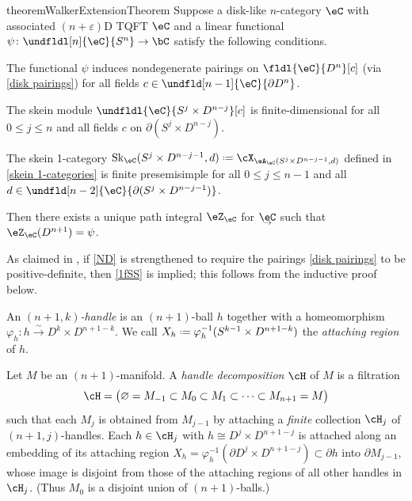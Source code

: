 \documentclass[12pt,reqno]{amsart}
\newcommand{\Sk}{\mathrm{Sk}}
\newcommand{\A}{\eA}
\newcommand{\C}{\eC}
\newcommand{\Z}{\eZ}
\newcommand{\e}{\varepsilon}
\newcommand{\bdy}{\partial}
\newcommand{\defn}[1]{\emph{#1}}
\DeclareRobustCommand{\coloneq}{\mathrel{\vcenter{\baselineskip0.5ex\lineskiplimit0pt\hbox{\scriptsize{\upshape.}}\hbox{\scriptsize{\upshape.}}}}=}
\newcommand{\undCtemp}{\bgroup\smash[b]{\text{$\underset{\smash{\raisebox{.225em}{$\scriptstyle\kern.05ex\rightarrow$}}}{\smash{\C}}$}}\egroup}
\newcommand{\undC}{\vphantom{\C}{\undCtemp}}
\begin{document}
\begin{restatable}{theorem}{WalkerExtensionTheorem}
    \label{WalkerTheorem}
    Suppose a disk-like $n$-category $\C$ with associated $(n+\e)$D TQFT $\C$ and a linear functional $\psi\colon
    \undfldl[n]{\C}{S^n}\to\bC$ satisfy the following conditions.
    \begin{lst}
        \item[(ND)]\label{ND} The functional $\psi$ induces nondegenerate pairings on $\fldl{\C}{D^n}[c]$ (via \eqref{disk pairings}) for all fields $c\in\undfld[n-1]{\C}{\partial D^n}$.
        \item[(0fSS)]\label{0fSS} The skein module $\undfldl{\C}{S^j\times D^{n-j}}[c]$ is finite-dimensional for all $0\leq j\leq n$ and all fields $c$ on $\bdy(S^j\times D^{n-j})$.
        \item[(1fSS)]\label{1fSS} The skein 1-category $\Sk_\C(S^j\times D^{n-j-1},d)\coloneq\cX_{\A_\C(S^{j}\times D^{n-j-1},d)}$ defined in \cref{skein 1-categories} is finite presemisimple for all $0\leq j\leq n-1$ and all $d\in\undfld[n-2]{\C}{\bdy(S^j\times D^{n-j-1})}$.
    \end{lst}
    Then there exists a unique path integral $\Z_\C$ for $\undC$ such that $\Z_\C(D^{n+1})=\psi$.
\end{restatable}

\begin{remark}\label{redundantIH3}
As claimed in \cite{W06}, if \ref{ND} is strengthened to require the pairings \eqref{disk pairings} to be positive-definite, then \ref{1fSS} is implied; this follows from the inductive proof below.
\end{remark}

An \defn{$(n+1,k)$-handle} is an $(n+1)$-ball $h$ together with a homeomorphism $\varphi_h\colon h\overset\sim\to D^{k}\times D^{n+1-k}$. We call $X_h\coloneq \varphi_h^{-1}(S^{k-1}\times D^{n+1-k})$ the \defn{attaching region} of $h$.


\begin{definition}
Let $M$ be an $(n+1)$-manifold. A \defn{handle decomposition} $\cH$ of $M$ is a filtration
\[
  \cH=\big(\varnothing = M_{-1} \subset M_0 \subset M_1 \subset \cdots \subset M_{n+1} = M\big)
\]
such that each $M_j$ is obtained from $M_{j-1}$ by attaching a \emph{finite} collection $\cH_j$ of $(n+1,j)$-handles. Each $h\in\cH_j$ with $h\cong D^j\times D^{n+1-j}$ is attached along an embedding of its attaching region $X_h=\varphi_h^{-1}(\partial D^j\times D^{n+1-j})\subset\partial h$ into $\partial M_{j-1}$, whose image is disjoint from those of the attaching regions of all other handles in $\cH_j$. (Thus $M_0$ is a disjoint union of $(n+1)$-balls.)
\end{definition}
\end{document}
